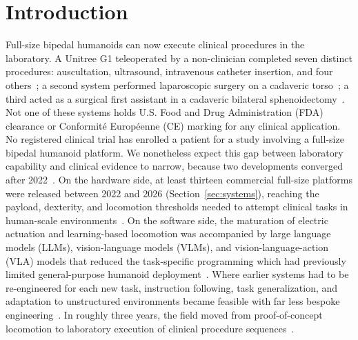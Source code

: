 ﻿%
\section{Introduction}
\label{sec:intro}

Full-size bipedal humanoids can now execute clinical procedures in the
laboratory. A Unitree G1 teleoperated by a non-clinician completed seven
distinct procedures: auscultation, ultrasound, intravenous catheter insertion,
and four others~\cite{atar2025humanoids}; a second system performed
laparoscopic surgery on a cadaveric torso~\cite{liang2025lapsurgie}; a third
acted as a surgical first assistant in a cadaveric bilateral
sphenoidectomy~\cite{cho2026humanoid}. Not one of these systems holds U.S. Food and Drug Administration (FDA)
clearance or Conformit\'{e} Europ\'{e}enne (CE) marking for any clinical
application. No registered clinical
trial has enrolled a patient for a study involving a full-size bipedal humanoid
platform. We nonetheless expect this gap between laboratory capability and
clinical evidence to narrow, because two developments converged after
2022~\cite{gu2025humanoid,cao2025humanoid}. On the hardware side, at least
thirteen commercial full-size platforms were released between 2022 and 2026
(Section~\ref{sec:systems}), reaching the payload, dexterity, and locomotion
thresholds needed to attempt clinical tasks in human-scale
environments~\cite{ifr2025humanoid,unitree2024g1,figureai2024unveils}. On the
software side, the maturation of electric actuation and learning-based
locomotion was accompanied by large language models (LLMs), vision-language
models (VLMs), and vision-language-action (VLA) models that reduced the
task-specific programming which had previously limited general-purpose humanoid
deployment~\cite{firoozi2025foundation,kawaharazuka2024realworld,kim2024survey}.
Where earlier systems had to be re-engineered for each new task, instruction
following, task generalization, and adaptation to unstructured environments
became feasible with far less bespoke
engineering~\cite{argall2009survey,ravichandar2020recent}. In roughly three
years, the field moved from proof-of-concept locomotion to laboratory execution
of clinical procedure
sequences~\cite{radosavovic2024realworld,atar2025humanoids,cho2026humanoid}.

